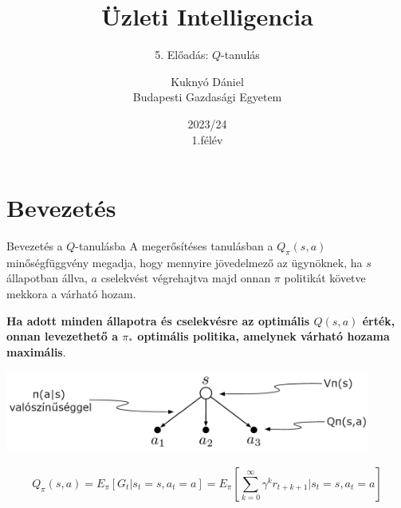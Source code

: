 \documentclass[english, aspectratio=169]{beamer}
\makeatletter
\newcommand\makebeamertitle{\frame{\maketitle}}
\let\origtableofcontents=\tableofcontents
\def\tableofcontents{\@ifnextchar[{\origtableofcontents}{\gobbletableofcontents}}
\def\gobbletableofcontents#1{\origtableofcontents}
\makeatother
\begin{document}
\section{Bevezetés}
\title[]{Üzleti Intelligencia}
\subtitle{5. Előadás: $Q$-tanulás}
\author[Kuknyó Dániel]{Kuknyó Dániel\\Budapesti Gazdasági Egyetem}
\date{2023/24\\1.félév}
\makebeamertitle

\begin{frame}
\tableofcontents{}
\end{frame}

\begin{frame}
\tableofcontents[currentsection]
\end{frame}

\begin{frame}{Bevezetés a $Q$-tanulásba}
A megerősítéses tanulásban a $Q_\pi(s,a)$ minőségfüggvény megadja, hogy mennyire jövedelmező az ügynöknek, ha $s$ állapotban állva, $a$ cselekvést végrehajtva majd onnan $\pi$ politikát követve mekkora a várható hozam.\par\smallskip
\textbf{Ha adott minden állapotra és cselekvésre az optimális $Q(s,a)$ érték, onnan levezethető a $\pi_*$ optimális politika, amelynek várható hozama maximális}.
\begin{center}
\includegraphics[width=12cm, keepaspectratio]{images/ql_1.png}
\begin{block}{}
\[
Q_\pi(s,a)=E_\pi \left[ G_t \vert s_t=s, a_t=a \right] = E_\pi \left[ \sum_{k=0}^\infty \gamma^kr_{t+k+1} \vert s_t=s, a_t=a \right]
\]
\end{block}
\end{center}
\end{frame}
\end{document}
